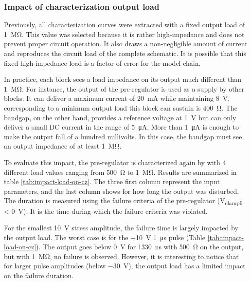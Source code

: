 \subsubsection{Impact of characterization output load}

Previously, all characterization curves were extracted with a fixed output load of \SI{1}{\mega\ohm}.
This value was selected because it is rather high-impedance and does not prevent proper circuit operation.
It also draws a non-negligible amount of current and reproduces the circuit load of the complete schematic.
It is possible that this fixed high-impedance load is a factor of error for the model chain.

In practice, each block sees a load impedance on its output much different than \SI{1}{\mega\ohm}.
For instance, the output of the pre-regulator is used as a supply by other blocks.
It can deliver a maximum current of \SI{20}{\milli\ampere} while maintaining \SI{8}{\volt}, corresponding to a minimum output load this block can sustain is \SI{400}{\ohm}.
The bandgap, on the other hand, provides a reference voltage at \SI{1}{\volt} but can only deliver a small DC current in the range of \SI{5}{\micro\ampere}.
More than \SI{1}{\micro\ampere} is enough to make the output fall of a hundred millivolts.
In this case, the bandgap must see an output impedance of at least \SI{1}{\mega\ohm}.

To evaluate this impact, the pre-regulator is characterized again by with 4 different load values ranging from \SI{500}{\ohm} to \SI{1}{\mega\ohm}.
Results are summarized in table \ref{tab:impact-load-on-cz}.
The three first column represent the input parameters, and the last column shows for how long the output was disturbed.
The duration is measured using the failure criteria of the pre-regulator (V\textsubscript{clamp9} < \SI{0}{\volt}).
It is the time during which the failure criteria was violated.

For the smallest \SI{10}{\volt} stress amplitude, the failure time is largely impacted by the output load.
The worst case is for the \SI{-10}{\volt} \SI{1}{\micro\second} pulse (Table \ref{tab:impact-load-on-cz}).
The output goes below \SI{0}{\volt} for \SI{1330}{\nano\second} with \SI{500}{\ohm} on the output, but with \SI{1}{\mega\ohm}, no failure is observed.
However, it is interesting to notice that for larger pulse amplitudes (below \SI{-30}{\volt}), the output load has a limited impact on the failure duration.

